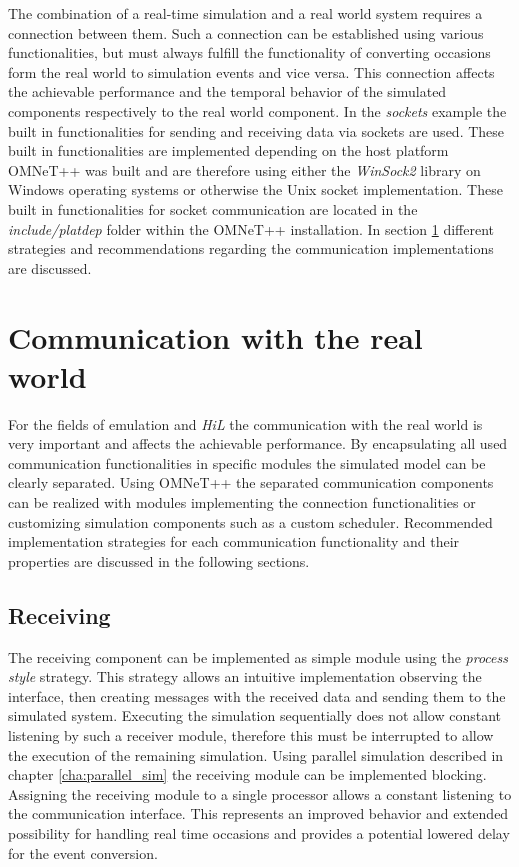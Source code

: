 The combination of a real-time simulation and a real world system requires a connection between them.
Such a connection can be established using various functionalities, but must always fulfill the functionality of converting occasions form the real world to simulation events and vice versa.
This connection affects the achievable performance and the temporal behavior of the simulated components respectively to the real world component.
In the \emph{sockets} example the built in functionalities for sending and receiving data via sockets are used.
These built in functionalities are implemented depending on the host platform OMNeT++ was built and are therefore using either the \emph{WinSock2} library on Windows operating systems or otherwise the Unix socket implementation.
These built in functionalities for socket communication are located in the \emph{include/platdep} folder within the OMNeT++ installation.
In section \ref{sec:emulation_communication} different strategies and recommendations regarding the communication implementations are discussed.

\section{Communication with the real world}
\label{sec:emulation_communication}
For the fields of emulation and \emph{HiL} the communication with the real world is very important and affects the achievable performance.
By encapsulating all used communication functionalities in specific modules the simulated model can be clearly separated.
Using OMNeT++ the separated communication components can be realized with modules implementing the connection functionalities or customizing simulation components such as a custom scheduler.
Recommended implementation strategies for each communication functionality and their properties are discussed in the following sections.

\subsection{Receiving}
\label{sec:emulation_communication_receiving}

The receiving component can be implemented as simple module using the \emph{process style} strategy.
This strategy allows an intuitive implementation observing the interface, then creating messages with the received data and sending them to the simulated system.
Executing the simulation sequentially does not allow constant listening by such a receiver module, therefore this must be interrupted to allow the execution of the remaining simulation.
Using parallel simulation described in chapter \ref{cha:parallel_sim} the receiving module can be implemented blocking.
Assigning the receiving module to a single processor allows a constant listening to the communication interface.
This represents an improved behavior and extended possibility for handling real time occasions and provides a potential lowered delay for the event conversion.

